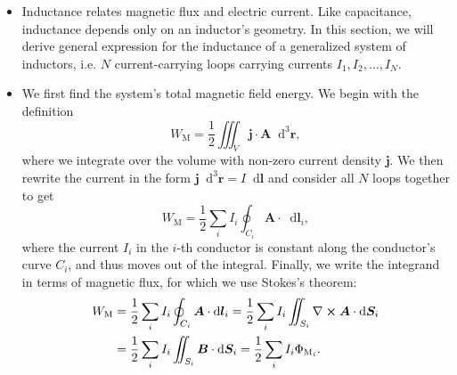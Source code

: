 \documentclass[11pt, a4paper]{article}
\newcommand{\diff}{\mathop{}\!\mathrm{d}} %
\newcommand{\dr}{\diff^{3} \r}  %
\renewcommand{\vec}[1]{\bm{#1}} %
\renewcommand{\r}{\vec{r}}
\newcommand{\B}{\vec{B}} %
\newcommand{\A}{\vec{A}} %
\renewcommand{\j}{\vec{j}}  %
\renewcommand{\curl}{\nabla \cross}
\begin{document}
\begin{itemize}
	\item Inductance relates magnetic flux and electric current. Like capacitance, inductance depends only on an inductor's geometry. In this section, we will derive general expression for the inductance of a generalized system of inductors, i.e. $ N $ current-carrying loops carrying currents $ I_{1}, I_{2}, \ldots, I_{N} $.
	
	\item We first find the system's total magnetic field energy. We begin with the definition
	\begin{equation*}
		W_{\text{M}} = \frac{1}{2}\iiint_{V}\j \cdot \A \dr,
	\end{equation*}
	where we integrate over the volume with non-zero current density $ \j $. We then rewrite the current in the form $ \j \dr = I \diff \vec{l} $ and consider all $ N $ loops together to get
	\begin{equation*}
		W_{\text{M}} = \frac{1}{2}\sum_{i}I_{i}\oint_{C_{i}} \A \cdot \diff \vec{l}_{i},
	\end{equation*}
	where the current $ I_{i} $ in the $ i $-th conductor is constant along the conductor's curve $ C_{i} $, and thus moves out of the integral. Finally, we write the integrand in terms of magnetic flux, for which we use Stokes's theorem:
	\begin{align*}
        W_{\text{M}} &= \frac{1}{2}\sum_{i}I_{i}\oint_{C_{i}} \A \cdot \diff \vec{l}_{i} = \frac{1}{2}\sum_{i}I_{i}\iint_{S_{i}} \curl \A \cdot \diff \vec{S}_{i} \\
        &= \frac{1}{2}\sum_{i}I_{i}\iint_{S_{i}} \B \cdot \diff \vec{S}_{i} = \frac{1}{2}\sum_{i}I_{i} \Phi_{\text{M}_{i}}.
	\end{align*}
	

\end{itemize}
\end{document}
